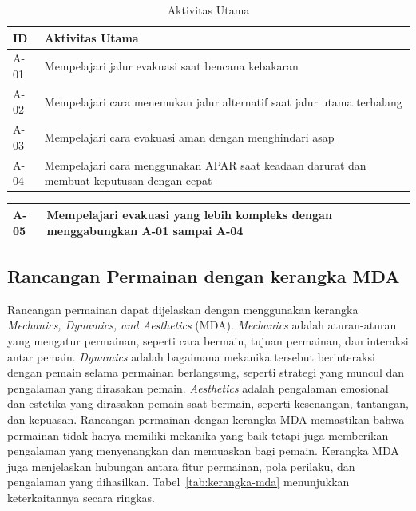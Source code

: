 \begin{table}[h!]
\centering
\caption{Aktivitas Utama}
\begin{tabular}{|p{2cm}|p{12cm}|}
\hline
\textbf{ID} & \textbf{Aktivitas Utama}  \\ \hline
A-01 & Mempelajari jalur evakuasi saat bencana kebakaran  \\ \hline
A-02 & Mempelajari cara menemukan jalur alternatif saat jalur utama terhalang \\ \hline
A-03 & Mempelajari cara evakuasi aman dengan menghindari asap \\ \hline
A-04 & Mempelajari cara menggunakan APAR saat keadaan darurat dan membuat keputusan dengan cepat  \\ \hline
\end{tabular}

\label{tab:scores}
\end{table}

\begin{table}[h!]
\centering
\begin{tabular}{|p{2cm}|p{12cm}|}
\hline


A-05 & Mempelajari evakuasi yang lebih kompleks dengan menggabungkan A-01 sampai A-04  \\ \hline
\end{tabular}
\end{table}



\subsection{Rancangan Permainan dengan kerangka MDA}
Rancangan permainan dapat dijelaskan dengan menggunakan kerangka \textit{Mechanics, Dynamics, and Aesthetics} (MDA). \textit{Mechanics} adalah aturan-aturan yang mengatur permainan, seperti cara bermain, tujuan permainan, dan interaksi antar pemain. \textit{Dynamics} adalah bagaimana mekanika tersebut berinteraksi dengan pemain selama permainan berlangsung, seperti strategi yang muncul dan pengalaman yang dirasakan pemain. \textit{Aesthetics} adalah pengalaman emosional dan estetika yang dirasakan pemain saat bermain, seperti kesenangan, tantangan, dan kepuasan. Rancangan permainan dengan kerangka MDA memastikan bahwa permainan tidak hanya memiliki mekanika yang baik tetapi juga memberikan pengalaman yang menyenangkan dan memuaskan bagi pemain. Kerangka MDA juga menjelaskan hubungan antara fitur permainan, pola perilaku, dan pengalaman yang dihasilkan. Tabel~\ref{tab:kerangka-mda} menunjukkan keterkaitannya secara ringkas.

